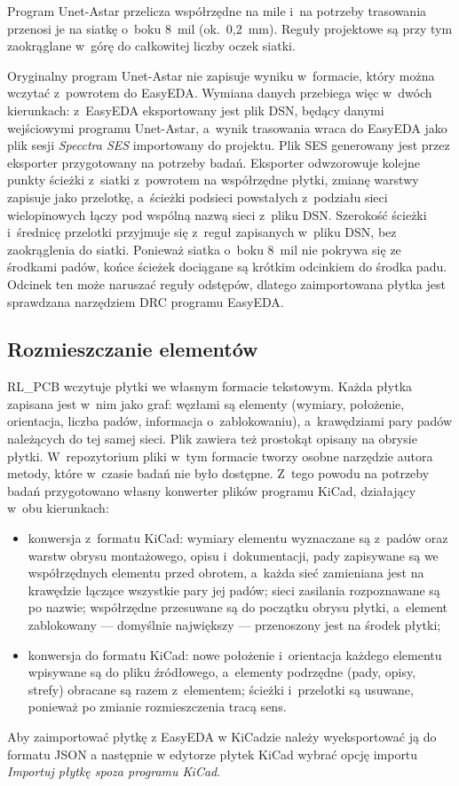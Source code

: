 Program Unet-Astar przelicza współrzędne na mile i~na potrzeby trasowania
przenosi je na siatkę o~boku 8~mil (ok.~0{,}2~mm). Reguły projektowe są przy
tym zaokrąglane w~górę do całkowitej liczby oczek siatki.

Oryginalny program Unet-Astar nie zapisuje wyniku w~formacie, który można
wczytać z~powrotem do EasyEDA. Wymiana danych przebiega więc w~dwóch
kierunkach: z~EasyEDA eksportowany jest plik DSN, będący danymi wejściowymi
programu Unet-Astar, a~wynik trasowania wraca do EasyEDA jako plik sesji
\emph{Specctra SES} importowany do projektu.
Plik SES generowany jest przez eksporter przygotowany na potrzeby badań.
Eksporter odwzorowuje kolejne punkty ścieżki z~siatki
z~powrotem na współrzędne płytki, zmianę warstwy zapisuje jako przelotkę,
a~ścieżki podsieci powstałych z~podziału sieci wielopinowych łączy pod
wspólną nazwą sieci z~pliku DSN. Szerokość ścieżki i~średnicę przelotki
przyjmuje się z~reguł zapisanych w~pliku DSN, bez zaokrąglenia do siatki.
Ponieważ siatka o~boku 8~mil nie pokrywa się ze środkami padów, końce
ścieżek dociągane są krótkim odcinkiem do środka padu. Odcinek ten
może naruszać reguły odstępów, dlatego zaimportowana płytka jest
sprawdzana narzędziem DRC programu EasyEDA.

\subsection{Rozmieszczanie elementów}
\label{sec:format-rozmieszczanie}

RL\_PCB wczytuje płytki we własnym formacie tekstowym. Każda płytka
zapisana jest w~nim jako graf: węzłami są elementy (wymiary, położenie,
orientacja, liczba padów, informacja o~zablokowaniu), a~krawędziami pary
padów należących do tej samej sieci. Plik zawiera też prostokąt
opisany na obrysie płytki. W~repozytorium pliki w~tym formacie tworzy
osobne narzędzie autora metody, które w~czasie badań nie było dostępne.
Z~tego powodu na potrzeby badań przygotowano własny konwerter plików
programu KiCad, działający w~obu kierunkach:
\begin{itemize}
  \item konwersja z~formatu KiCad: wymiary elementu wyznaczane są
    z~padów oraz warstw obrysu montażowego, opisu i~dokumentacji, pady
    zapisywane są we współrzędnych elementu przed obrotem, a~każda sieć
    zamieniana jest na krawędzie łączące wszystkie pary jej padów; sieci
    zasilania rozpoznawane są po nazwie; współrzędne przesuwane są do
    początku obrysu płytki, a~element zablokowany --- domyślnie największy
    --- przenoszony jest na środek płytki;
  \item konwersja do formatu KiCad: nowe położenie i~orientacja każdego
    elementu wpisywane są do pliku źródłowego, a~elementy podrzędne
    (pady, opisy, strefy) obracane są razem z~elementem; ścieżki
    i~przelotki są usuwane, ponieważ po zmianie rozmieszczenia tracą sens.
\end{itemize}
Aby zaimportować płytkę z EasyEDA w KiCadzie należy wyeksportować ją 
do formatu JSON a następnie w edytorze płytek KiCad wybrać opcję importu
\emph{Importuj płytkę spoza programu KiCad}.

